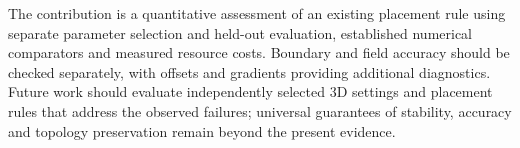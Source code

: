 \documentclass[12pt,letterpaper]{article}
\begin{document}
The contribution is a quantitative assessment of an existing placement rule using separate parameter selection and held-out evaluation, established numerical comparators and measured resource costs. Boundary and field accuracy should be checked separately, with offsets and gradients providing additional diagnostics. Future work should evaluate independently selected 3D settings and placement rules that address the observed failures; universal guarantees of stability, accuracy and topology preservation remain beyond the present evidence.

\clearpage
\begingroup\small

\endgroup
\end{document}
